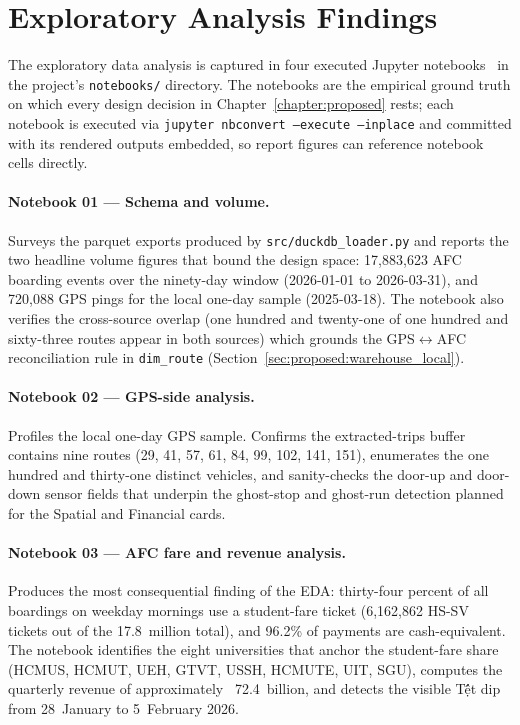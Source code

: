 \section{Exploratory Analysis Findings}
\label{sec:prototype:eda}

The exploratory data analysis is captured in four executed
Jupyter notebooks~\cite{jupyter} in the project's
\texttt{notebooks/} directory. The notebooks are the empirical
ground truth on which every design decision in
Chapter~\ref{chapter:proposed} rests; each notebook is executed
via \texttt{jupyter nbconvert --execute --inplace} and committed
with its rendered outputs embedded, so report figures can
reference notebook cells directly.

\paragraph{Notebook 01 --- Schema and volume.}
Surveys the parquet exports produced by
\texttt{src/duckdb\_loader.py} and reports the two headline
volume figures that bound the design space: 17{,}883{,}623 AFC
boarding events over the ninety-day window
(2026-01-01 to 2026-03-31), and 720{,}088 GPS pings for the
local one-day sample (2025-03-18). The notebook also verifies
the cross-source overlap (one hundred and twenty-one of one
hundred and sixty-three routes appear in both sources) which
grounds the GPS$\leftrightarrow$AFC reconciliation rule in
\texttt{dim\_route} (Section~\ref{sec:proposed:warehouse_local}).

\paragraph{Notebook 02 --- GPS-side analysis.}
Profiles the local one-day GPS sample. Confirms the
extracted-trips buffer contains nine routes (29, 41, 57, 61, 84,
99, 102, 141, 151), enumerates the one hundred and thirty-one
distinct vehicles, and sanity-checks the door-up and door-down
sensor fields that underpin the ghost-stop and ghost-run
detection planned for the Spatial and Financial cards.

\paragraph{Notebook 03 --- AFC fare and revenue analysis.}
Produces the most consequential finding of the EDA: thirty-four
percent of all boardings on weekday mornings use a student-fare
ticket (6{,}162{,}862 HS-SV tickets out of the 17.8~million
total), and 96.2\% of payments are cash-equivalent. The notebook
identifies the eight universities that anchor the student-fare
share (HCMUS, HCMUT, UEH, GTVT, USSH, HCMUTE, UIT, SGU),
computes the quarterly revenue of approximately
\textcent~72.4~billion, and detects the visible T\d ết dip from
28~January to 5~February 2026.

